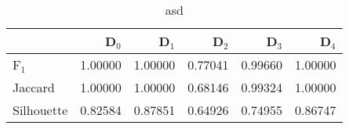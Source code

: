 \begin{table}
\centering
\caption{asd}
\label{tab:s1-orig-eca-single}
\begin{tabular}{lrrrrr}
\toprule
{} &   D$_0$ &   D$_1$ &   D$_2$ &   D$_3$ &   D$_4$ \\
\midrule
F$_1$      & 1.00000 & 1.00000 & 0.77041 & 0.99660 & 1.00000 \\
Jaccard    & 1.00000 & 1.00000 & 0.68146 & 0.99324 & 1.00000 \\
Silhouette & 0.82584 & 0.87851 & 0.64926 & 0.74955 & 0.86747 \\
\bottomrule
\end{tabular}
\end{table}

